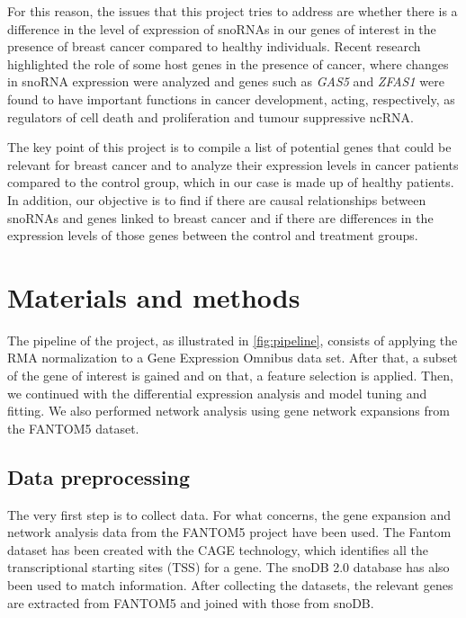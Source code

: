 \documentclass[journal]{IEEEtran}
\begin{document}
For this reason, the issues that this project tries to address are whether there is a difference in the level of expression of snoRNAs in our genes of interest in the presence of breast cancer compared to healthy individuals. \newline
Recent research highlighted the role of some host genes in the presence of cancer, where changes in snoRNA expression were analyzed and genes such as \emph{GAS5} and \emph{ZFAS1} were found to have important functions in cancer development, acting, respectively, as regulators of cell death and proliferation and tumour suppressive ncRNA\cite{Williams2012}. \newline

The key point of this project is to compile a list of potential genes that could be relevant for breast cancer and to analyze their expression levels in cancer patients compared to the control group, which in our case is made up of healthy patients.
In addition, our objective is to find if there are causal relationships between snoRNAs and genes linked to breast cancer and if there are differences in the expression levels of those genes between the control and treatment groups.

\section{Materials and methods}
The pipeline of the project, as illustrated in \cref{fig:pipeline}, consists of applying the RMA normalization to a Gene Expression Omnibus data set. After that, a subset of the gene of interest is gained and on that, a feature selection is applied. Then, we continued with the differential expression analysis and model tuning and fitting. 
We also performed network analysis using gene network expansions from the FANTOM5 dataset.

\subsection{Data preprocessing}
The very first step is to collect data.
For what concerns, the gene expansion and network analysis data from the FANTOM5 project\cite{Lizio2015} have been used.
The Fantom dataset has been created with the CAGE technology, which identifies all the transcriptional starting sites (TSS) for a gene. \newline
The snoDB 2.0 database\cite{Bergeron2022} has also been used to match information. After collecting the datasets, the relevant genes are extracted from FANTOM5 and joined with those from snoDB. 
\end{document}
